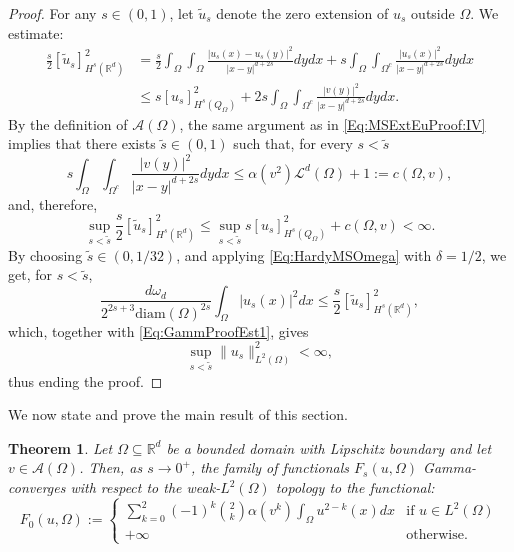 \documentclass[reqno,11pt]{amsart}
\numberwithin{equation}{section}
\theoremstyle{definition} %
\theoremstyle{plain}
\newtheorem{theo}[theo]{Theorem}  %
\theoremstyle{definition}
\theoremstyle{remark}
\def\O{\Omega}
\def\io{\int_\Omega}
\def\L{\mathcal{L}}
\def\R{\mathbb{R}}
\begin{document}
\begin{proof}
    For any $s\in(0,1)$, let $\tilde{u}_s$ denote the zero extension of $u_s$ outside $\O$. We estimate:
    \begin{align*}
        \frac{s}{2}[\tilde{u}_s]_{H^s(\R^d)}^2&=\frac{s}{2}\int_\O\int_\O\frac{|u_s(x)-u_s(y)|^2}{|x-y|^{d+2s}}dydx+s\int_\O\int_{\O^c}\frac{|u_s(x)|^2}{|x-y|^{d+2s}}dydx\\
        &\leq s[u_s]_{H^s(Q_\O)}^2+2s\int_\O\int_{\O^c}\frac{|v(y)|^2}{|x-y|^{d+2s}}dydx.
    \end{align*}
    By the definition of $\mathcal{A}(\O)$, the same argument as in \eqref{Eq:MSExtEuProof:IV} implies that there exists $\tilde{s}\in (0,1)$ such that, for every $s<\tilde{s}$
    \begin{equation*}
        s\int_\O\int_{\O^c}\frac{|v(y)|^2}{|x-y|^{d+2s}}dydx\leq \alpha(v^2)\L^d(\O)+1:=c(\O,v),
    \end{equation*}
    and, therefore,
    \begin{equation}
        \label{Eq:GammProofEst1}
        \sup_{s<\tilde{s}}\frac{s}{2}[\tilde{u}_s]_{H^s(\R^d)}^2\leq \sup_{s<\tilde{s}} s [u_s]_{H^s(Q_\O)}^2 + c(\O,v)
        <\infty .   
    \end{equation}
    By choosing $\tilde{s}\in(0,1/32)$, and applying \eqref{Eq:HardyMSOmega} with $\delta=1/2$, we get, for $s<\tilde s$, 
    \begin{equation*}
         \frac{d\omega_d}{2^{2s+3}\mathrm{diam}(\O)^{2s}}\int_{\O}|u_s(x)|^2dx \leq  \frac{s}{2}[\tilde{u}_s]_{H^s(\R^d)}^2 ,
    \end{equation*}
    which, together with \eqref{Eq:GammProofEst1}, gives
    \begin{equation}
         \sup_{s<\tilde{s}}\|u_s\|^2_{L^2(\O)} <\infty,
    \end{equation}
    thus ending the proof.
\end{proof}
We now state and prove the main result of this section.
\begin{theo}
    \label{Theo:MSGamma}
    Let $\O\subseteq \R^d$ be a bounded domain with Lipschitz boundary and let $v\in\mathcal{A}(\O)$. Then, as $s\to 0^+$, the family of functionals $F_s(u,\O)$ Gamma-converges with respect to the weak-$L^2(\O)$ topology to the functional:
    \begin{equation}
        F_0(u,\O):=
        \begin{cases}
            \sum_{k=0}^2 (-1)^k\binom{2}{k}\alpha(v^k)\io u^{2-k}(x)dx &\text{if }u\in L^2(\O)\\
            +\infty &\text{otherwise.}
        \end{cases}
    \end{equation}
\end{theo}
\end{document}

